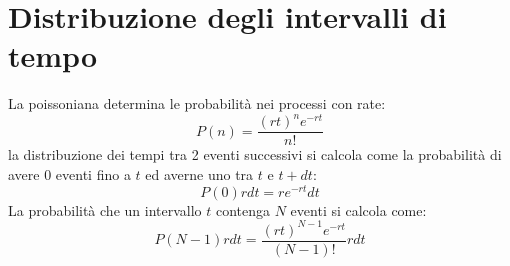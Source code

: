 \section{Distribuzione degli intervalli di tempo}
La poissoniana determina le probabilit\`a nei processi con rate:
\begin{equation*}
P(n) = \frac{(rt)^n e^{-rt}}{n!}
\end{equation*}
la distribuzione dei tempi tra 2 eventi successivi si calcola come la probabilit\`a di avere 0 eventi fino a $t$ ed averne uno tra $t$ e $t+dt$:
\begin{equation*}
P(0) rdt= re^{-rt}dt
\end{equation*}
La probabilit\`a che un intervallo $t$ contenga $N$ eventi si calcola come:
\begin{equation*}
P(N-1)rdt=\frac{(rt)^{N-1}e^{-rt}}{(N-1)!}rdt
\end{equation*}